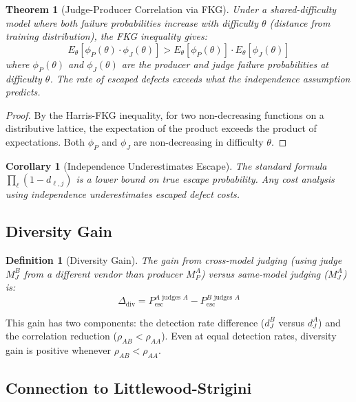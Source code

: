 \documentclass[11pt, a4paper, logo, copyright]{googledeepmind}
\newtheorem{definition}{Definition}[section]
\newtheorem{theorem}{Theorem}[section]
\newtheorem{corollary}{Corollary}[section]
\newcommand{\Pesc}{P_{\mathrm{esc}}}
\begin{document}
\begin{theorem}[Judge-Producer Correlation via FKG]
\label{thm:fkg}
Under a shared-difficulty model where both failure probabilities increase with difficulty $\theta$ (distance from training distribution), the FKG inequality \citep{fkg1971} gives:
\begin{equation}
E_\theta[\phi_P(\theta) \cdot \phi_J(\theta)] > E_\theta[\phi_P(\theta)] \cdot E_\theta[\phi_J(\theta)]
\end{equation}
where $\phi_P(\theta)$ and $\phi_J(\theta)$ are the producer and judge failure probabilities at difficulty $\theta$. The rate of escaped defects exceeds what the independence assumption predicts.
\end{theorem}

\begin{proof}
By the Harris-FKG inequality, for two non-decreasing functions on a distributive lattice, the expectation of the product exceeds the product of expectations. Both $\phi_P$ and $\phi_J$ are non-decreasing in difficulty $\theta$.
\end{proof}

\begin{corollary}[Independence Underestimates Escape]
\label{cor:underestimate}
The standard formula $\prod_\ell (1 - d_{\ell,j})$ is a lower bound on true escape probability. Any cost analysis using independence underestimates escaped defect costs.
\end{corollary}

\subsection{Diversity Gain}

\begin{definition}[Diversity Gain]
The gain from cross-model judging (using judge $M_J^B$ from a different vendor than producer $M_P^A$) versus same-model judging ($M_J^A$) is:
\begin{equation}
\Delta_{\mathrm{div}} = \Pesc^{A \text{ judges } A} - \Pesc^{B \text{ judges } A}
\end{equation}
\end{definition}

This gain has two components: the detection rate difference ($d_J^B$ versus $d_J^A$) and the correlation reduction ($\rho_{AB} < \rho_{AA}$). Even at equal detection rates, diversity gain is positive whenever $\rho_{AB} < \rho_{AA}$.

\subsection{Connection to Littlewood-Strigini}
\end{document}
